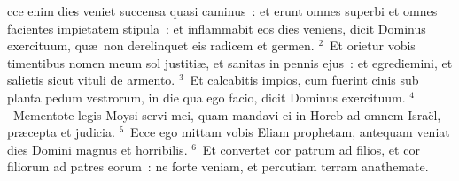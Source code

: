 \bchapter
{}cce enim dies veniet succensa quasi caminus~: et erunt omnes superbi et omnes facientes impietatem stipula~: et inflammabit eos dies veniens, dicit Dominus exercituum, qu\ae\ non derelinquet eis radicem et germen.
${}^{2}$~Et orietur vobis timentibus nomen meum sol justiti\ae , et sanitas in pennis ejus~: et egrediemini, et salietis sicut vituli de armento.
${}^{3}$~Et calcabitis impios, cum fuerint cinis sub planta pedum vestrorum, in die qua ego facio, dicit Dominus exercituum.
${}^{4}$~Mementote legis Moysi servi mei, quam mandavi ei in Horeb ad omnem Isra\"el, pr\ae cepta et judicia.
${}^{5}$~Ecce ego mittam vobis Eliam prophetam, antequam veniat dies Domini magnus et horribilis.
${}^{6}$~Et convertet cor patrum ad filios, et cor filiorum ad patres eorum~: ne forte veniam, et percutiam terram anathemate.
